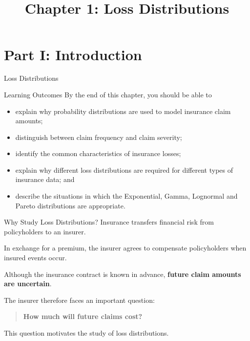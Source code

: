 \documentclass[
  ignorenonframetext,
  aspectratio=169,
]{beamer}
\title{\texorpdfstring{Chapter 1: Loss
Distributions}{Chapter 1: Loss Distributions}}
\author{}
\date{}
\providecommand{\tightlist}{%
  \setlength{\itemsep}{0pt}\setlength{\parskip}{0pt}}
\begin{document}
\frame{\titlepage}


\section{Part I: Introduction}\label{part-i-introduction}

\begin{frame}{Loss Distributions}
\protect{}\label{loss-distributions}
\begin{block}{Learning Outcomes}
\protect{}\label{learning-outcomes}
By the end of this chapter, you should be able to

\begin{itemize}
\tightlist
\item
  explain why probability distributions are used to model insurance
  claim amounts;
\item
  distinguish between claim frequency and claim severity;
\item
  identify the common characteristics of insurance losses;
\item
  explain why different loss distributions are required for different
  types of insurance data; and
\item
  describe the situations in which the Exponential, Gamma, Lognormal and
  Pareto distributions are appropriate.
\end{itemize}
\end{block}
\end{frame}

\begin{frame}{Why Study Loss Distributions?}
\protect{}\label{why-study-loss-distributions}
Insurance transfers financial risk from policyholders to an insurer.

In exchange for a premium, the insurer agrees to compensate
policyholders when insured events occur.

Although the insurance contract is known in advance, \textbf{future
claim amounts are uncertain}.

The insurer therefore faces an important question:

\begin{quote}
\textbf{How much will future claims cost?}
\end{quote}

This question motivates the study of loss distributions.
\end{frame}
\end{document}
